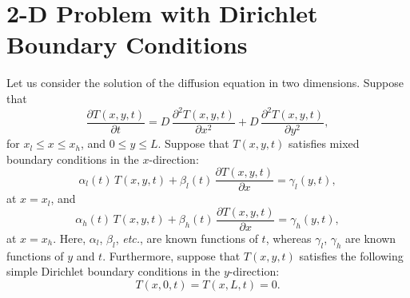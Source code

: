 \section{2-D Problem with Dirichlet Boundary Conditions}
Let us consider the solution of the diffusion equation in two dimensions. Suppose
that
\begin{equation}\label{diff2deq}
\frac{\partial T(x,y,t)}{\partial t} = D\,\frac{\partial^2 T(x,y,t)}{\partial x^2}+D\,\frac{\partial^2 T(x,y,t)}
{\partial y^2},
\end{equation}
for $x_l\leq x\leq x_h$, and $0\leq y\leq L$. Suppose that $T(x,y,t)$ satisfies mixed
boundary conditions in the $x$-direction:
\begin{equation}
\alpha_l(t)\,T(x,y,t) + \beta_l(t)\,\frac{\partial T(x,y,t)}{\partial x} = \gamma_l(y,t),
\end{equation}
at $x=x_l$, and
\begin{equation}
\alpha_h(t) \,T(x,y,t)+ \beta_h(t)\,\frac{\partial T(x,y,t)}{\partial x} = \gamma_h(y,t),
\end{equation}
at $x=x_h$. Here, $\alpha_l$, $\beta_l$, {\em etc.}, are known functions of $t$,
whereas $\gamma_l$, $\gamma_h$ are known functions of $y$ and $t$.
 Furthermore, suppose that $T(x,y,t)$ satisfies the following simple Dirichlet boundary
conditions in the $y$-direction:
\begin{equation}
T(x,0,t) = T(x,L,t) = 0.
\end{equation}

